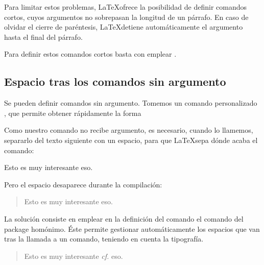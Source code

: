 Para limitar estos problemas, \LaTeX ofrece la posibilidad de definir comandos cortos, cuyos argumentos no sobrepasan la longitud de un párrafo. En caso de olvidar el cierre de paréntesis, \LaTeX detiene automáticamente el argumento hasta el final del párrafo.

Para definir estos comandos cortos basta con emplear .

\begin{latexcode}
\newcommand*{\autor}[1]{\textsc{#1}*}
\end{latexcode}

\subsection{Espacio tras los comandos sin argumento}

Se pueden definir comandos sin argumento. Tomemos un comando personalizado , que permite obtener rápidamente la forma \forme{\cf}

\begin{latexcode}
\newcommand{\cf}[0]{\emph{cf.}}
\end{latexcode}

Como nuestro comando no recibe argumento, es necesario, cuando lo llamemos, separarlo del texto siguiente con un espacio, para que \LaTeX sepa dónde acaba el comando: 

\begin{latexcode}
Esto es muy interesante \cf eso.
\end{latexcode}

Pero el espacio desaparece durante la compilación:

\begin{quotation}
Esto es muy interesante \cf eso.
\end{quotation}

La solución consiste en emplear en la definición del comando el comando  del package homónimo. Éste permite gestionar automáticamente los espacios que van tras la llamada a un comando, teniendo en cuenta la tipografía.

\begin{latexcode}
\newcommand{\cf}[0]{\emph{cf.}\xspace}
\end{latexcode}

\renewcommand{\cf}[0]{\emph{cf.}\xspace}

\begin{quotation}
Esto es muy interesante \cf eso.
\end{quotation}

